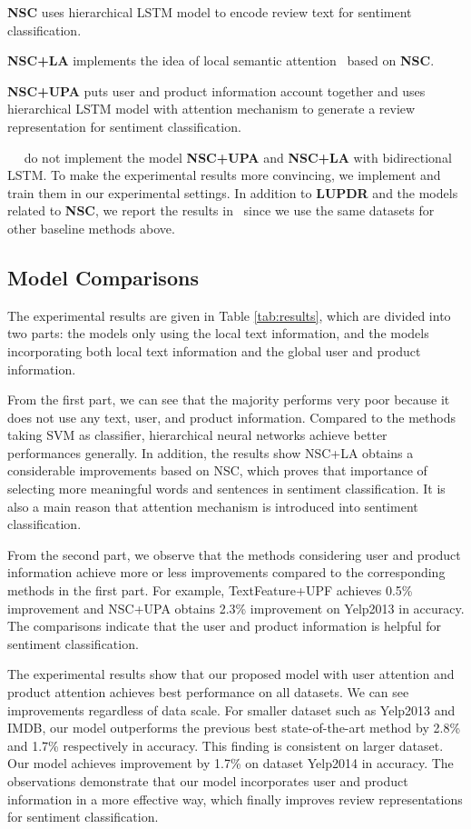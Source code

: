 \documentclass[letterpaper]{article} \usepackage{aaai18}  \usepackage{times}  \usepackage{helvet}  \usepackage{courier}  \usepackage{url}  \usepackage{graphicx}  \frenchspacing  \usepackage{amsmath}
\begin{document}
\textbf{NSC} uses hierarchical LSTM model to encode review text for sentiment classification.

\textbf{NSC+LA} implements the idea of local semantic attention~\cite{yang2016hierarchical} based on \textbf{NSC}.

\textbf{NSC+UPA} puts user and product information account together and uses hierarchical LSTM model with attention mechanism to generate a review representation for sentiment classification.

~\citeauthor{chen2016neural}~ do not implement the model \textbf{NSC+UPA} and \textbf{NSC+LA} with bidirectional LSTM. To make the experimental results more convincing, we implement and train them in our experimental settings. In addition to \textbf{LUPDR} and the models related to \textbf{NSC}, we report the results in~\cite{tang2015learning} since we use the same datasets for other baseline methods above.

\subsection{Model Comparisons}
The experimental results are given in Table \ref{tab:results}, which are divided into two parts: the models only using the local text information, and the models incorporating both local text information and the global user and product information.

From the first part, we can see that the majority performs very poor because it does not use any text, user, and product information. Compared to the methods taking SVM as classifier, hierarchical neural networks achieve better performances generally. In addition, the results show NSC+LA obtains a considerable improvements based on NSC, which proves that importance of selecting more meaningful words and sentences in sentiment classification. It is also a main reason that attention mechanism is introduced into sentiment classification.

From the second part, we observe that the methods considering user and product information achieve more or less improvements compared to the corresponding methods in the first part. For example, TextFeature+UPF achieves 0.5\% improvement and NSC+UPA obtains 2.3\% improvement on Yelp2013 in accuracy. The comparisons indicate that the user and product information is helpful for sentiment classification.

The experimental results show that our proposed model with user attention and product attention achieves best performance on all datasets. We can see improvements regardless of data scale. For smaller dataset such as Yelp2013 and IMDB, our model outperforms the previous best state-of-the-art method by 2.8\% and 1.7\% respectively in accuracy. This finding is consistent on larger dataset. Our model achieves improvement by 1.7\% on dataset Yelp2014 in accuracy. The observations demonstrate that our model incorporates user and product information in a more effective way, which finally improves review representations for sentiment classification.
\end{document}
